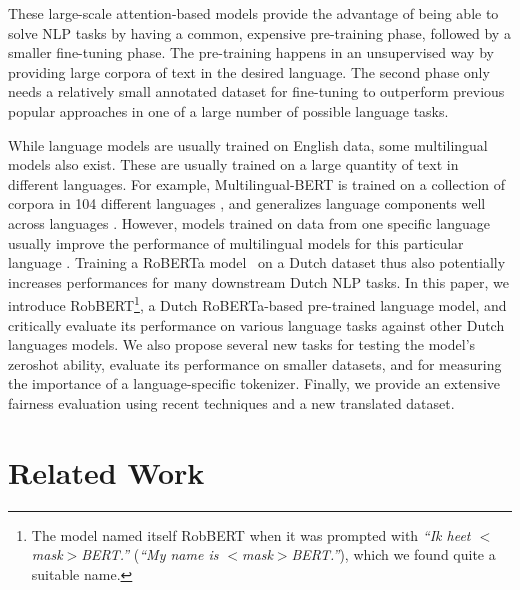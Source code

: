 \documentclass[11pt,a4paper]{article}
\begin{document}
These large-scale attention-based models provide the advantage of being able to solve NLP tasks by having a common, expensive pre-training phase, followed by a smaller fine-tuning phase.
The pre-training happens in an unsupervised way by providing large corpora of text in the desired language.
The second phase only needs a relatively small annotated dataset for fine-tuning to outperform previous popular approaches in one of a large number of possible language tasks.

While language models are usually trained on English data, some multilingual models also exist.
These are usually trained on a large quantity of text in different languages.
For example, Multilingual-BERT is trained on a collection of corpora in 104 different languages \citep{devlinBERT2019a}, and generalizes language components well across languages \citep{pires2019multilingual}.
However, models trained on data from one specific language usually improve the performance of multilingual models for this particular language \citep{martinCamemBERT2019,devriesBERTje2019}.
Training a RoBERTa model~\citep{liuRoBERTa2019} on a Dutch dataset thus also potentially increases performances for many downstream Dutch NLP tasks.
In this paper, we introduce RobBERT\footnote{The model named itself RobBERT when it was prompted with \textit{``Ik heet $<$mask$>$BERT.''} (\textit{``My name is $<$mask$>$BERT.''}), which we found quite a suitable name.}, a Dutch RoBERTa-based pre-trained language model, and critically evaluate its performance on various language tasks against other Dutch languages models.
We also propose several new tasks for testing the model's zeroshot ability, evaluate its performance on smaller datasets, and for measuring the importance of a language-specific tokenizer.
Finally, we provide an extensive fairness evaluation using recent techniques and a new translated dataset.


\section{Related Work}
\label{sec:related-work}
\end{document}
